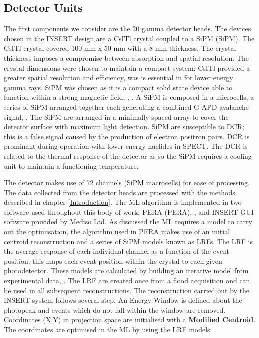 \subsection{Detector Units}
The first components we consider are the 20 gamma detector heads.  The devices chosen in the INSERT design are a \acrlong{CsITl} crystal coupled to a \acrlong{SiPM} (\acrshort{SiPM}). The \acrshort{CsITl} crystal covered 100 mm x 50 mm with a 8 mm thickness. The crystal thickness imposes a compromise between absorption and spatial resolution. The crystal dimensions were chosen to maintain a compact system; \acrshort{CsITl} provided a greater spatial resolution and efficiency, was is essential in for lower energy gamma rays. \acrshort{SiPM} was chosen as it is a compact solid state device able to function within a strong magnetic field, \cite{SCHAART201631}, \cite{0031-9155-56-23-014}. A \acrshort{SiPM} is composed in a microcells, a series of \acrshort{SiPM} arranged together each generating a combined \acrshort{G-APD} avalanche signal, \cite{DINU2015367}. The \acrshort{SiPM} are arranged in a minimally spaced array to cover the detector surface with maximum light detection. \acrshort{SiPM} are susceptible to \acrlong{DCR}; this is a false signal caused by the production of electron positron pairs. \acrshort{DCR} is prominant during operation with lower energy nuclides in \acrshort{SPECT}. The \acrshort{DCR} is related to the thermal response of the detector as so the \acrshort{SiPM} requires a cooling unit to maintain a functioning temperature. 

The detector makes use of 72 channels (\acrshort{SiPM} macrocells) for ease of processing. The data collected from the detector heads are processed with the methods described in chapter \ref{Introduction}. The \acrshort{ML} algorithm is implemented in two software used throughout this body of work; \acrshort{PERA} (\acrlong{PERA}), \cite{michele}, and INSERT GUI software provided by Mediso Ltd. As discussed the \acrshort{ML} requires a model to carry out the optimisation, the algorithm used in \acrshort{PERA} makes use of an initial centroid reconstruction and a series of \acrshort{SiPM} models known as \acrlong{LRF}s. The \acrshort{LRF} is the average response of each individual channel as a function of the event position; this maps each event position within the crystal to each given photodetector. These models are calculated by building an iterative model from experimental data, \cite{solovov}. The \acrshort{LRF} are created once from a flood acquisition and can be used in all subsequent reconstructions. The reconstruction carried out by the \acrshort{INSERT} system follows several step. An {Energy Window} is defined about the photopeak and events which do not fall within the window are removed. Coordinates (X,Y) in projection space are initialised with a \textbf{Modified Centroid}. The coordinates are optimised in the \acrshort{ML} by using the \acrshort{LRF} models: 

